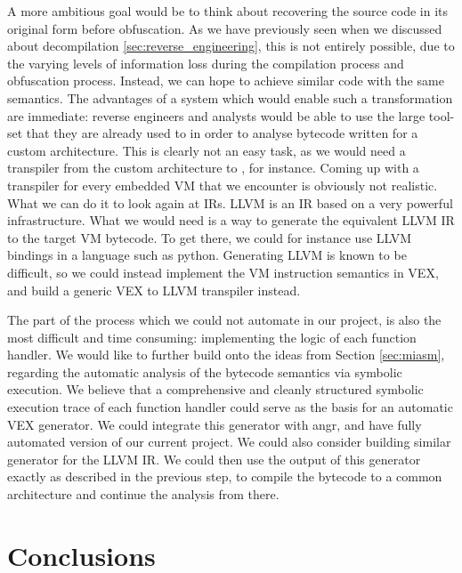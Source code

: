 A more ambitious goal would be to think about recovering the source code in its original form before obfuscation. As we have previously seen when we discussed about decompilation \ref{sec:reverse_engineering}, this is not entirely possible, due to the varying levels of information loss during the compilation process and obfuscation process. Instead, we can hope to achieve similar code with the same semantics. The advantages of a system which would enable such a transformation are immediate: reverse engineers and analysts would be able to use the large tool-set that they are already used to in order to analyse bytecode written for a custom architecture. This is clearly not an easy task, as we would need a transpiler from the custom architecture to , for instance. Coming up with a transpiler for every embedded \gls{VM} that we encounter is obviously not realistic. What we can do it to look again at \glspl{IR}. LLVM \cite{llvm} is an \gls{IR} based on a very powerful infrastructure. What we would need is a way to generate the equivalent LLVM \gls{IR} to the target \gls{VM} bytecode. To get there, we could for instance use LLVM bindings in a language such as python. Generating LLVM is known to be difficult, so we could instead implement the \gls{VM} instruction semantics in VEX, and build a generic VEX to LLVM transpiler instead.

The part of the process which we could not automate in our project, is also the most difficult and time consuming: implementing the logic of each function handler. We would like to further build onto the ideas from Section \ref{sec:miasm}, regarding the automatic analysis of the bytecode semantics via symbolic execution. We believe that a comprehensive and cleanly structured symbolic execution trace of each function handler could serve as the basis for an automatic VEX generator. We could integrate this generator with angr, and have fully automated version of our current project. We could also consider building similar generator for the LLVM \gls{IR}. We could then use the output of this generator exactly as described in the previous step, to compile the bytecode to a common architecture and continue the analysis from there.

\chapter{Conclusions}




